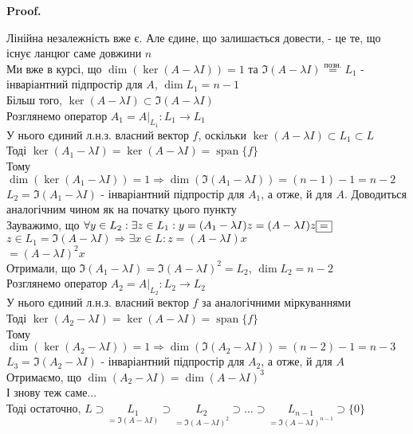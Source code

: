 \documentclass[a4paper, 10pt]{article}
\makeatletter
\theoremstyle{theoremdd}
\DeclareMathOperator{\linspan}{span}
\renewenvironment{proof}[1][Proof.\\]{\par
\pushQED{\hfill \qed}%
\normalfont \topsep6\p@\@plus6\p@\relax
\trivlist
\item\relax
{\bfseries
#1\@addpunct{.}}\hspace\labelsep\ignorespaces
}{%
\popQED\endtrivlist\@endpefalse
}
\makeatother
\begin{document}
\begin{proof}
Лінійна незалежність вже є. Але єдине, що залишається довести, - це те, що існує ланцюг саме довжини $n$\\
Ми вже в курсі, що $\dim(\ker(A-\lambda I)) = 1$ та $\Im(A-\lambda I) \overset{\textrm{позн.}}{=} L_1$ - інваріантний підпростір для $A$, $\dim L_1 = n-1$\\
Більш того, $\ker(A-\lambda I) \subset \Im(A-\lambda I)$
\bigskip \\
Розглянемо оператор $A_1 = A |_{L_1}: L_1 \to L_1$\\
У нього єдиний л.н.з. власний вектор $f$, оскільки $\ker(A-\lambda I) \subset L_1 \subset L$\\
Тоді $\ker(A_1-\lambda I) = \ker(A-\lambda I) = \linspan\{f\}$\\
Тому $\dim(\ker(A_1 - \lambda I)) = 1 \Rightarrow \dim (\Im(A_1-\lambda I)) = (n-1)-1=n-2$\\
$L_2 = \Im(A_1-\lambda I)$ - інваріантний підпростір для $A_1$, а отже, й для $A$. Доводиться аналогічним чином як на початку цього пункту\\
Зауважимо, що $\forall y \in L_2: \exists z \in L_1: \\ y = (A_1 - \lambda I)z = (A-\lambda I)z \boxed{=}$\\
$z \in L_1 = \Im(A-\lambda I) \Rightarrow \exists x \in L: z = (A-\lambda I)x$\\
$\boxed{=} (A-\lambda I)^2 x$\\
Отримали, що $\Im(A_1 - \lambda I) = \Im(A-\lambda I)^2 = L_2$, $\dim L_2 = n-2$
\bigskip \\
Розглянемо оператор $A_2 = A |_{L_2}: L_2 \to L_2$\\
У нього єдиний л.н.з. власний вектор $f$ за аналогічними міркуваннями\\
Тоді $\ker(A_2-\lambda I) = \ker(A-\lambda I) = \linspan\{f\}$\\
Тому $\dim(\ker(A_2 - \lambda I)) = 1 \Rightarrow \dim (\Im(A_2-\lambda I)) = (n-2)-1=n-3$\\
$L_3 = \Im(A_2-\lambda I)$ - інваріантний підпростір для $A_2$, а отже, й для $A$\\
Отримаємо, що $\dim (A_2 - \lambda I) = \dim (A-\lambda I)^3$\\
І знову теж саме...
\bigskip \\
Тоді остаточно, $L \supset \underset{=\Im(A-\lambda I)}{L_1} \supset \underset{=\Im(A-\lambda I)^2}{L_2} \supset \dots \supset \underset{=\Im(A-\lambda I)^{n-1}}{L_{n-1}} \supset \{0\}$\\

\end{proof}
\end{document}
